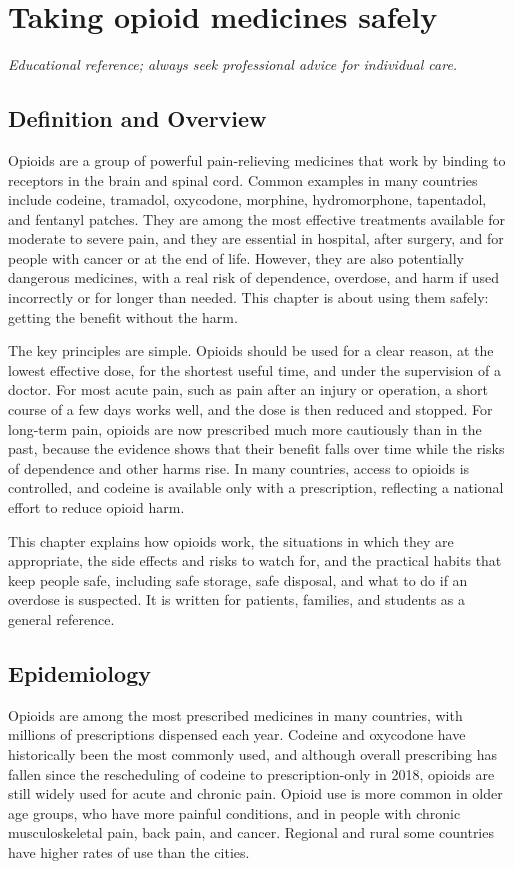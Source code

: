 \chapter{Taking opioid medicines safely}

\medskip
\noindent\textit{Educational reference; always seek professional advice for individual care.}

\section*{Definition and Overview}
Opioids are a group of powerful pain-relieving medicines that work by binding to receptors in the brain and spinal cord. Common examples in many countries include codeine, tramadol, oxycodone, morphine, hydromorphone, tapentadol, and fentanyl patches. They are among the most effective treatments available for moderate to severe pain, and they are essential in hospital, after surgery, and for people with cancer or at the end of life. However, they are also potentially dangerous medicines, with a real risk of dependence, overdose, and harm if used incorrectly or for longer than needed. This chapter is about using them safely: getting the benefit without the harm.

The key principles are simple. Opioids should be used for a clear reason, at the lowest effective dose, for the shortest useful time, and under the supervision of a doctor. For most acute pain, such as pain after an injury or operation, a short course of a few days works well, and the dose is then reduced and stopped. For long-term pain, opioids are now prescribed much more cautiously than in the past, because the evidence shows that their benefit falls over time while the risks of dependence and other harms rise. In many countries, access to opioids is controlled, and codeine is available only with a prescription, reflecting a national effort to reduce opioid harm.

This chapter explains how opioids work, the situations in which they are appropriate, the side effects and risks to watch for, and the practical habits that keep people safe, including safe storage, safe disposal, and what to do if an overdose is suspected. It is written for patients, families, and students as a general reference.

\section*{Epidemiology}
Opioids are among the most prescribed medicines in many countries, with millions of prescriptions dispensed each year. Codeine and oxycodone have historically been the most commonly used, and although overall prescribing has fallen since the rescheduling of codeine to prescription-only in 2018, opioids are still widely used for acute and chronic pain. Opioid use is more common in older age groups, who have more painful conditions, and in people with chronic musculoskeletal pain, back pain, and cancer. Regional and rural some countries have higher rates of use than the cities.

